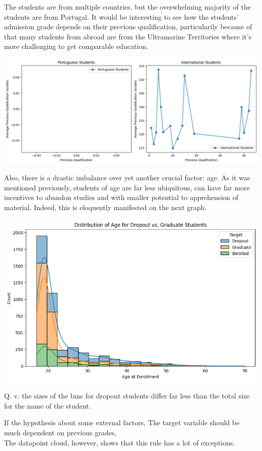 \documentclass[
  letterpaper,
  DIV=11,
  numbers=noendperiod]{scrartcl}
\begin{document}
The students are from multiple countries, but the overwhelming majority
of the students are from Portugal. It would be interesting to see how
the students' admission grade depends on their previous qualification,
particularily because of that many students from abroad are from the
Ultramarine Territories where it's more challenging to get comparable
education.

\includegraphics{report_AzadhdhinNedalYunisAlFraijat_files/figure-pdf/cell-7-output-1.png}

Also, there is a drastic imbalance over yet another crucial factor: age.
As it was mentioned previously, students of age are far less ubiquitous,
can have far more incentives to abandon studies and with smaller
potential to apprehension of material. Indeed, this is eloquently
manifested on the next graph.

\includegraphics{report_AzadhdhinNedalYunisAlFraijat_files/figure-pdf/cell-8-output-1.png}

Q. v. the sizes of the bins for dropout students differ far less than
the total size for the name of the student.

If the hypothesis about some external factors, The target variable
should be much dependent on previous grades,\\
The datapoint cloud, however, shows that this rule has a lot of
exceptions.
\end{document}
